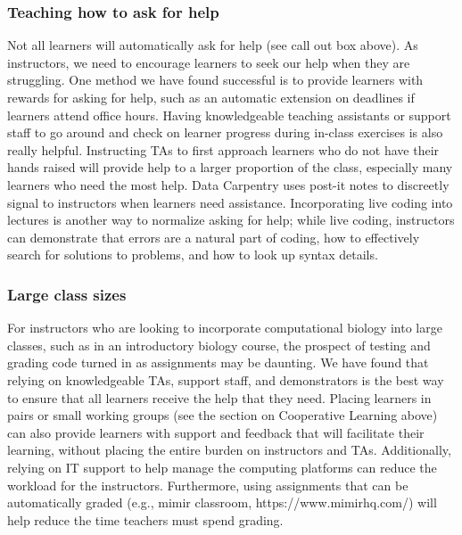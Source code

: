 \subsubsection{Teaching how to ask for help}
Not all learners will automatically ask for help (see call out box above). 
As instructors, we need to encourage learners to seek our help when they are struggling.
One method we have found successful is to provide learners with rewards for asking for help, such as an automatic extension on deadlines if learners attend office hours.
Having knowledgeable teaching assistants or support staff to go around and check on learner progress during in-class exercises is also really helpful.
Instructing TAs to first approach learners who do not have their hands raised will provide help to a larger proportion of the class, especially many learners who need the most help.
Data Carpentry uses post-it notes to discreetly signal to instructors when learners need assistance.
Incorporating live coding into lectures is another way to normalize asking for help; while live coding, instructors can demonstrate that errors are a natural part of coding, how to effectively search for solutions to problems, and how to look up syntax details.

\subsubsection{Large class sizes}

For instructors who are looking to incorporate computational biology into large classes, such as in an introductory biology course, the prospect of testing and grading code turned in as assignments may be daunting. 
We have found that relying on knowledgeable TAs, support staff, and demonstrators is the best way to ensure that all learners receive the help that they need.
Placing learners in pairs or small working groups (see the section on Cooperative Learning above) can also provide learners with support and feedback that will facilitate their learning, without placing the entire burden on instructors and TAs.
Additionally, relying on IT support to help manage the computing platforms can reduce the workload for the instructors.
Furthermore, using assignments that can be automatically graded (e.g., mimir classroom, https://www.mimirhq.com/) will help reduce the time teachers must spend grading.



